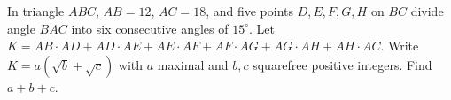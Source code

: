 In triangle $ABC$, $AB=12$, $AC=18$, and five points $D,E,F,G,H$ on $BC$ divide angle $BAC$ into six consecutive angles of $15^\circ$. Let $K=AB\cdot AD+AD\cdot AE+AE\cdot AF+AF\cdot AG+AG\cdot AH+AH\cdot AC$. Write $K=a(\sqrt b+\sqrt c)$ with $a$ maximal and $b,c$ squarefree positive integers. Find $a+b+c$.
